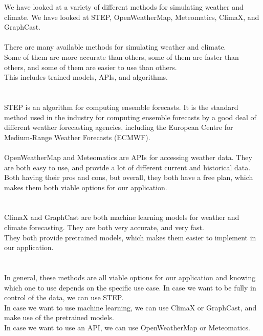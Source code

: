 \documentclass[../paper.tex]{subfiles}
\begin{document}
    We have looked at a variety of different methods for simulating weather and climate.
    We have looked at STEP, OpenWeatherMap, Meteomatics, ClimaX, and GraphCast.
    \\\\
    There are many available methods for simulating weather and climate. \\
    Some of them are more accurate than others, some of them are faster than others, and some of them are easier to use than others. \\
    This includes trained models, APIs, and algorithms. \\
    \\\\
    STEP is an algorithm for computing ensemble forecasts.
    It is the standard method used in the industry for computing ensemble forecasts by a good deal of different weather forecasting agencies, including the European Centre for Medium-Range Weather Forecasts (ECMWF).
    \\\\
    OpenWeatherMap and Meteomatics are APIs for accessing weather data.
    They are both easy to use, and provide a lot of different current and historical data. \\
    Both having their pros and cons, but overall, they both have a free plan, which makes them both viable options for our application. \\
    \\\\
    ClimaX and GraphCast are both machine learning models for weather and climate forecasting.
    They are both very accurate, and very fast. \\
    They both provide pretrained models, which makes them easier to implement in our application. \\
    \\\\
    In general, these methods are all viable options for our application and knowing which one to use depends on the specific use case.
    In case we want to be fully in control of the data, we can use STEP. \\
    In case we want to use machine learning, we can use ClimaX or GraphCast, and make use of the pretrained models. \\
    In case we want to use an API, we can use OpenWeatherMap or Meteomatics.
\end{document}
